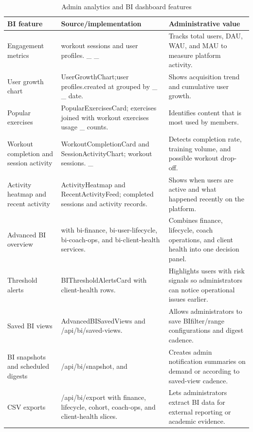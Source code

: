 \documentclass[12pt,a4paper,openany]{report}
\begin{document}
\begingroup
\footnotesize
\setlength{\tabcolsep}{3pt}
\renewcommand{\arraystretch}{1.20}
\setlength{\LTpre}{5pt}
\setlength{\LTpost}{10pt}
\begin{longtable}{|L{3.67cm}|L{5.29cm}|L{5.73cm}|}
\caption{Admin analytics and BI dashboard features}\label{tab:pdf-79-36} \\
\hline
BI feature & Source/implementation & Administrative value \\ \hline
Engagement metrics &   workout sessions and user profiles. \_ \_ & Tracks total users, DAU, WAU, and MAU to measure platform activity. \\ \hline
User growth chart & UserGrowthChart;user profiles.created at grouped by \_ \_ date. & Shows acquisition trend and cumulative user growth. \\ \hline
Popular exercises & PopularExercisesCard; exercises joined with workout exercises usage \_ counts. & Identifies content that is most used by members. \\ \hline
Workout completion and session activity & WorkoutCompletionCard and SessionActivityChart; workout sessions. \_ & Detects completion rate, training volume, and possible workout drop-off. \\ \hline
Activity heatmap and recent activity & ActivityHeatmap and RecentActivityFeed; completed sessions and activity records. & Shows when users are active and what happened recently on the platform. \\ \hline
Advanced BI overview &  with bi-finance, bi-user-lifecycle, bi-coach-ops, and bi-client-health services. & Combines finance, lifecycle, coach operations, and client health into one decision panel. \\ \hline
Threshold alerts & BIThresholdAlertsCard with client-health rows. & Highlights users with risk signals so administrators can notice operational issues earlier. \\ \hline
Saved BI views & AdvancedBISavedViews and /api/bi/saved-views. & Allows administrators to save BIfilter/range configurations and digest cadence. \\ \hline
BI snapshots and scheduled digests &  /api/bi/snapshot, and  & Creates admin notification summaries on demand or according to saved-view cadence. \\ \hline
CSV exports & /api/bi/export with finance, lifecycle, cohort, coach-ops, and client-health slices. & Lets administrators extract BI data for external reporting or academic evidence. \\ \hline
\end{longtable}
\endgroup
\end{document}

